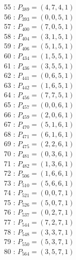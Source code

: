 \documentclass{article}
\begin{document}
{\begin{multicols}{3}
55 : $P_{389}=( 4, 7, 4, 1 )$\\
56 : $P_{393}=( 0, 0, 5, 1 )$\\
57 : $P_{400}=( 7, 0, 5, 1 )$\\
58 : $P_{404}=( 3, 1, 5, 1 )$\\
59 : $P_{406}=( 5, 1, 5, 1 )$\\
60 : $P_{434}=( 1, 5, 5, 1 )$\\
61 : $P_{436}=( 3, 5, 5, 1 )$\\
62 : $P_{441}=( 0, 6, 5, 1 )$\\
63 : $P_{442}=( 1, 6, 5, 1 )$\\
64 : $P_{456}=( 7, 7, 5, 1 )$\\
65 : $P_{457}=( 0, 0, 6, 1 )$\\
66 : $P_{459}=( 2, 0, 6, 1 )$\\
67 : $P_{470}=( 5, 1, 6, 1 )$\\
68 : $P_{471}=( 6, 1, 6, 1 )$\\
69 : $P_{475}=( 2, 2, 6, 1 )$\\
70 : $P_{481}=( 0, 3, 6, 1 )$\\
71 : $P_{482}=( 1, 3, 6, 1 )$\\
72 : $P_{506}=( 1, 6, 6, 1 )$\\
73 : $P_{510}=( 5, 6, 6, 1 )$\\
74 : $P_{521}=( 0, 0, 7, 1 )$\\
75 : $P_{526}=( 5, 0, 7, 1 )$\\
76 : $P_{537}=( 0, 2, 7, 1 )$\\
77 : $P_{544}=( 7, 2, 7, 1 )$\\
78 : $P_{548}=( 3, 3, 7, 1 )$\\
79 : $P_{550}=( 5, 3, 7, 1 )$\\
80 : $P_{564}=( 3, 5, 7, 1 )$\\
\end{multicols}


%


%


}%
\end{document}
